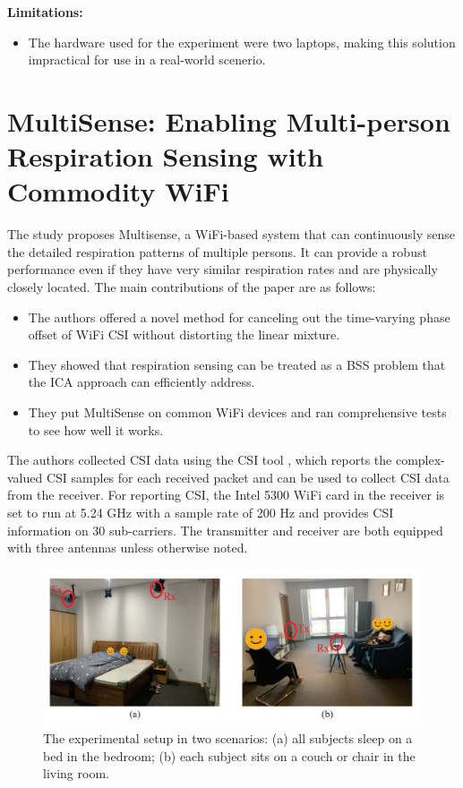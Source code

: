  \textbf{Limitations:}

\begin{itemize}
\item The hardware used for the experiment were two laptops, making this solution impractical for use in a real-world scenerio. 
\end{itemize}

\section{MultiSense: Enabling Multi-person Respiration Sensing with Commodity WiFi}
The study \cite{10.1145/3411816} proposes Multisense, a WiFi-based system that can continuously
sense the detailed respiration patterns of multiple persons. It can provide a robust performance even if they have very similar respiration rates and are physically closely located. The main contributions of the paper are as follows:
\begin{itemize}
    \item The authors offered a novel method for canceling out the time-varying phase offset of WiFi CSI without distorting the linear mixture. 
    \item They showed that respiration sensing can be treated as a BSS problem that the ICA approach can efficiently address.
    \item They put MultiSense on common WiFi devices and ran comprehensive tests to see how well it works.
\end{itemize}

The authors collected CSI data using the CSI tool \cite{7010501}, which reports the complex-valued CSI samples for each received packet and can be used to collect CSI data from the receiver. For reporting CSI, the Intel 5300 WiFi card in the receiver is set to run at 5.24 GHz with a sample rate of 200 Hz and provides CSI information on 30 sub-carriers. The transmitter and receiver are both equipped with three antennas unless otherwise noted.

\begin{figure}[H]
\centering
\includegraphics[width=1.0\textwidth]{./figure/chap 2/4.png}
\caption{The experimental setup in two scenarios: (a) all subjects sleep on a bed in the bedroom;
(b) each subject sits on a couch or chair in the living room.}
\label{2.4}
\end{figure}

